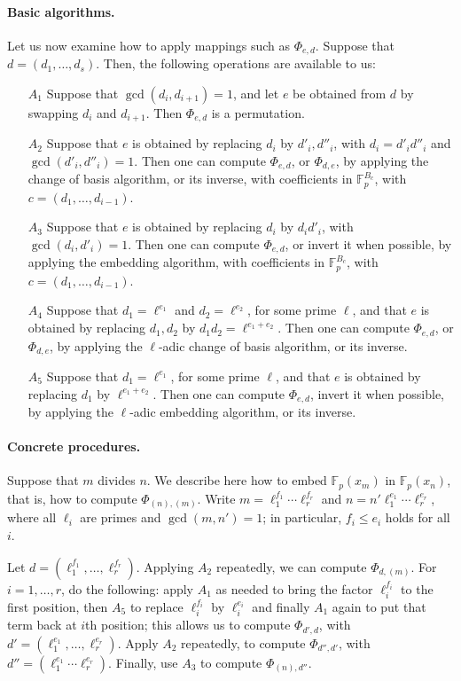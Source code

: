 \documentclass{sig-alternate}
\def\F {\ensuremath{\mathbb{F}}}
\begin{document}
\paragraph{Basic algorithms.}
Let us now examine how to apply mappings such as $\Phi_{e,d}$.
Suppose that $d=(d_1,\dots,d_s)$. Then, the following operations are
available to us:
\begin{itemize}
\item[$A_1$] Suppose that $\gcd(d_i,d_{i+1})=1$, and let $e$ be
  obtained from $d$ by swapping $d_i$ and $d_{i+1}$. Then $\Phi_{e,d}$
  is a permutation.
\item[$A_2$] Suppose that $e$ is obtained by replacing $d_i$ by $d'_i,
  d''_i$, with $d_i = d'_i d''_i$ and $\gcd(d'_i,d''_i)=1$. Then one
  can compute $\Phi_{e,d}$, or $\Phi_{d,e}$, by applying the change of
  basis algorithm, or its inverse, with coefficients in
  $\F_p^{B_c}$, with $c=(d_1,\dots,d_{i-1})$.
\item[$A_3$] Suppose that $e$ is obtained by replacing $d_i$ by $d_i
  d'_i$, with $\gcd(d_i, d'_i)=1$. Then one can compute $\Phi_{e,d}$,
  or invert it when possible, by applying the embedding algorithm,
  with coefficients in $\F_p^{B_c}$, with $c=(d_1,\dots,d_{i-1})$.
\item[$A_4$] Suppose that $d_1=\ell^{e_1}$ and $d_2=\ell^{e_2}$, for some
  prime $\ell$, and that $e$ is obtained by replacing $d_1,d_2$ by
  $d_1 d_2=\ell^{e_1+e_2}$. Then one can compute $\Phi_{e,d}$, or
  $\Phi_{d,e}$, by applying the $\ell$-adic change of basis algorithm,
  or its inverse. 
\item[$A_5$] Suppose that $d_1=\ell^{e_1}$, for some prime $\ell$, and that
  $e$ is obtained by replacing $d_1$ by $\ell^{e_1+e_2}$. Then one can
  compute $\Phi_{e,d}$, invert it when possible, by applying the
  $\ell$-adic embedding algorithm, or its inverse. 
\end{itemize}

\paragraph{Concrete procedures.} Suppose that $m$ divides $n$. We 
describe here how to embed $\F_p(x_m)$ in $\F_p(x_n)$, that is, how to
compute $\Phi_{(n),(m)}$. Write $m= \ell_1^{f_1}\cdots \ell_r^{f_r}$
and $n = n' \ell_1^{e_1}\cdots \ell_r^{e_r}$, where all $\ell_i$ are
primes and $\gcd(m,n')=1$; in particular, $f_i \le e_i$ holds for all
$i$.

Let $d=(\ell_1^{f_1},\dots,\ell_r^{f_r})$. Applying $A_2$ repeatedly,
we can compute $\Phi_{d,(m)}$. For $i=1,\dots,r$, do the following:
apply $A_1$ as needed to bring the factor $\ell_i^{f_i}$ to the first
position, then $A_5$ to replace $\ell_i^{f_i}$ by $\ell_i^{e_i}$ and
finally $A_1$ again to put that term back at $i$th position; this
allows us to compute $\Phi_{d',d}$, with
$d'=(\ell_1^{e_1},\dots,\ell_r^{e_r})$.  Apply $A_2$ repeatedly, to
compute $\Phi_{d'',d'}$, with $d''=(\ell_1^{e_1}\cdots\ell_r^{e_r})$.
Finally, use $A_3$ to compute $\Phi_{(n),d''}$.
\end{document}
